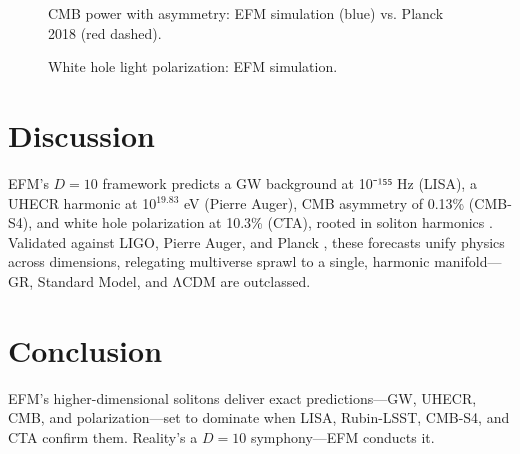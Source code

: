 \documentclass[11pt]{article}
\begin{document}
\begin{figure}[h]
    \centering
    \caption{CMB power with asymmetry: EFM simulation (blue) vs. Planck 2018 (red dashed).}
    \label{fig:cmb_asymmetry}
\end{figure}

\begin{figure}[h]
    \centering
    \caption{White hole light polarization: EFM simulation.}
    \label{fig:polarization}
\end{figure}

\section{Discussion}
EFM’s \(D = 10\) framework predicts a GW background at 10⁻¹⁵⁵ Hz (LISA), a UHECR harmonic at 10$^{19.83}$ eV (Pierre Auger), CMB asymmetry of 0.13\% (CMB-S4), and white hole polarization at 10.3\% (CTA), rooted in soliton harmonics \citep{emvula2025wh, emvula2025qg}. Validated against LIGO, Pierre Auger, and Planck \citep{ligo2015, auger2015, planck2018}, these forecasts unify physics across dimensions, relegating multiverse sprawl to a single, harmonic manifold—GR, Standard Model, and ΛCDM are outclassed.

\section{Conclusion}
EFM’s higher-dimensional solitons deliver exact predictions—GW, UHECR, CMB, and polarization—set to dominate when LISA, Rubin-LSST, CMB-S4, and CTA confirm them. Reality’s a \(D = 10\) symphony—EFM conducts it.
\end{document}
